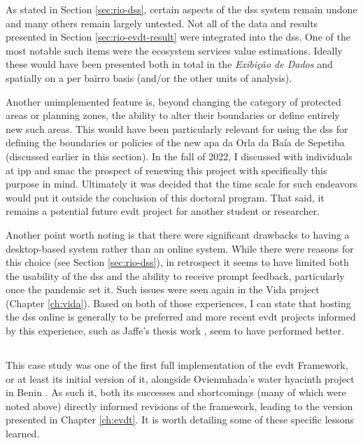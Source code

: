As stated in Section \ref{sec:rio-dss}, certain aspects of the \ac{dss} system remain undone and many others remain largely untested. Not all of the data and results presented in Section \ref{sec:rio-evdt-result} were integrated into the \ac{dss}. One of the most notable such items were the ecosystem services value estimations. Ideally these would have been presented both in total in the \textit{Exibição de Dados} and spatially on a per bairro basis (and/or the other units of analysis).

Another unimplemented feature is, beyond changing the category of protected areas or planning zones, the ability to alter their boundaries or define entirely new such areas. This would have been particularly relevant for using the \ac{dss} for defining the boundaries or policies of the new \ac{apa} da Orla da Baía de Sepetiba (discussed earlier in this section). In the fall of 2022, I discussed with individuals at \ac{ipp} and \ac{smac} the prospect of renewing this project with specifically this purpose in mind. Ultimately it was decided that the time scale for such endeavors would put it outside the conclusion of this doctoral program. That said, it remains a potential future \ac{evdt} project for another student or researcher. 

Another point worth noting is that there were significant drawbacks to having a desktop-based system rather than an online system. While there were reasons for this choice (see Section \ref{sec:rio-dss}), in retrospect it seems to have limited both the usability of the \ac{dss} and the ability to receive prompt feedback, particularly once the pandemic set it. Such issues were seen again in the Vida project (Chapter \ref{ch:vida}). Based on both of those experiences, I can state that hosting the \ac{dss} online is generally to be preferred and more recent \ac{evdt} projects informed by this experience, such as Jaffe's thesis work \cite{jaffeEnvironmentalEconomicSystems2022}, seem to have performed better.  

\subsection{} \label{sec:rio-lessons-learned}

This case study was one of the first full implementation of the \ac{evdt} Framework, or at least its initial version of it, alongside Ovienmhada's water hyacinth project in Benin \cite{ovienmhadaInclusiveDesignEarth2021}. As such it, both its successes and shortcomings (many of which were noted above) directly informed revisions of the framework, leading to the version presented in Chapter \ref{ch:evdt}. It is worth detailing some of these specific lessons learned.


